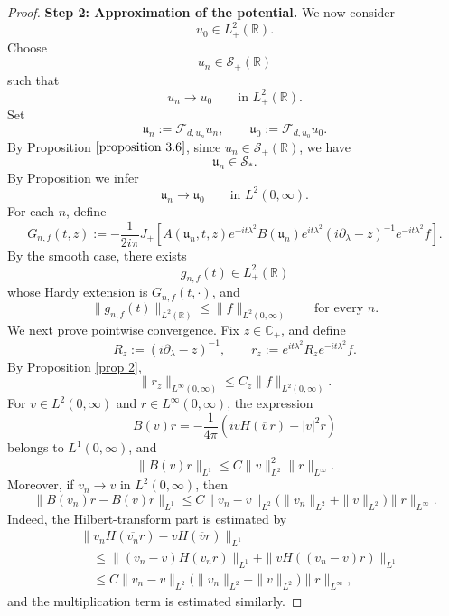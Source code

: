 \documentclass[10pt]{article}
\numberwithin{equation}{section}
\numberwithin{theorem}{section}
\begin{document}
\begin{appendix}
\begin{proof}
\medskip
\noindent
\textbf{Step 2: Approximation of the potential.}
We now consider
\[
u_0\in L^2_+(\mathbb R).
\]
Choose
\[
u_n\in\mathcal S_+(\mathbb R)
\]
such that
\[
u_n\to u_0
\qquad\text{in }L^2_+(\mathbb R).
\]
Set
\[
\mathfrak u_n:=\mathcal F_{d,u_n}u_n,
\qquad
\mathfrak u_0:=\mathcal F_{d,u_0}u_0.
\]
By Proposition \(\ref{proposition 3.6}\), since \(u_n\in\mathcal S_+(\mathbb R)\),
we have
\[
\mathfrak u_n\in\mathcal S_*.
\]
By Proposition we infer
\begin{equation}
\label{A.8.15}
\mathfrak u_n\to\mathfrak u_0
\qquad\text{in }L^2(0,\infty).
\end{equation}
For each \(n\), define
\begin{equation}
\label{A.8.16}
G_{n,f}(t,z)
:=
-\frac{1}{2i\pi}
J_+\left[
A(\mathfrak u_n,t,z)
e^{-it\lambda^2}
B(\mathfrak u_n)
e^{it\lambda^2}
(i\partial_\lambda-z)^{-1}
e^{-it\lambda^2}f
\right].
\end{equation}
By the smooth case, there exists
\[
g_{n,f}(t)\in L^2_+(\mathbb R)
\]
whose Hardy extension is \(G_{n,f}(t,\cdot)\), and
\begin{equation}
\label{A.8.17}
\|g_{n,f}(t)\|_{L^2(\mathbb R)}
\le
\|f\|_{L^2(0,\infty)}
\qquad\text{for every }n.
\end{equation}
We next prove pointwise convergence. Fix \(z\in\mathbb C_+\), and define
\[
R_z:=(i\partial_\lambda-z)^{-1},
\qquad
r_z:=e^{it\lambda^2}R_ze^{-it\lambda^2}f.
\]
By Proposition \ref{prop 2},
\begin{equation}
\label{A.8.18}
\|r_z\|_{L^\infty(0,\infty)}
\le
C_z\|f\|_{L^2(0,\infty)}.
\end{equation}
For \(v\in L^2(0,\infty)\) and \(r\in L^\infty(0,\infty)\), the expression
\[
B(v)r
=
-\frac1{4\pi}
\left(
ivH(\overline v\,r)-|v|^2r
\right)
\]
belongs to \(L^1(0,\infty)\), and
\begin{equation}
\label{A.8.19}
\|B(v)r\|_{L^1}
\le
C\|v\|_{L^2}^2\|r\|_{L^\infty}.
\end{equation}
Moreover, if \(v_n\to v\) in \(L^2(0,\infty)\), then
\begin{equation}
\label{A.8.20}
\|B(v_n)r-B(v)r\|_{L^1}
\le
C
\|v_n-v\|_{L^2}
\bigl(\|v_n\|_{L^2}+\|v\|_{L^2}\bigr)
\|r\|_{L^\infty}.
\end{equation}
Indeed, the Hilbert-transform part is estimated by
\[
\begin{aligned}
&\|v_nH(\overline{v_n}r)-vH(\overline v r)\|_{L^1} \\
&\quad\le
\|(v_n-v)H(\overline{v_n}r)\|_{L^1}
+
\|vH((\overline{v_n}-\overline v)r)\|_{L^1} \\
&\quad\le
C\|v_n-v\|_{L^2}
\bigl(\|v_n\|_{L^2}+\|v\|_{L^2}\bigr)
\|r\|_{L^\infty},
\end{aligned}
\]
and the multiplication term is estimated similarly.


\end{proof}
\end{appendix}
\end{document}
